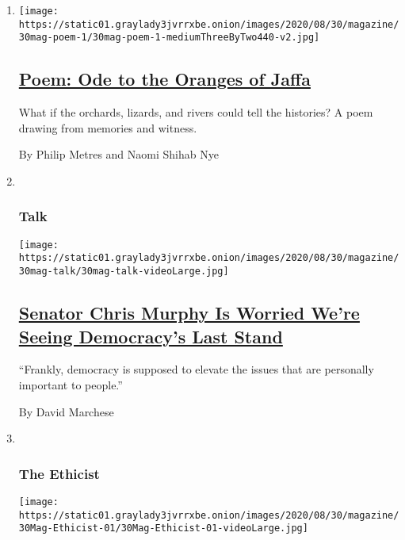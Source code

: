 \begin{enumerate}
\def\labelenumi{\arabic{enumi}.}
\item
  \texttt{[image: https://static01.graylady3jvrrxbe.onion/images/2020/08/30/magazine/30mag-poem-1/30mag-poem-1-mediumThreeByTwo440-v2.jpg]}

  \hypertarget{poem-ode-to-the-oranges-of-jaffa}{%
  \subsection{\texorpdfstring{\href{/2020/08/27/magazine/poem-ode-to-the-oranges-of-jaffa.html}{Poem:
  Ode to the Oranges of
  Jaffa}}{Poem: Ode to the Oranges of Jaffa}}\label{poem-ode-to-the-oranges-of-jaffa}}

  What if the orchards, lizards, and rivers could tell the histories? A
  poem drawing from memories and witness.

  By Philip Metres and Naomi Shihab Nye
\item ~
  \hypertarget{talk}{%
  \subsubsection{Talk}\label{talk}}

  \texttt{[image: https://static01.graylady3jvrrxbe.onion/images/2020/08/30/magazine/30mag-talk/30mag-talk-videoLarge.jpg]}

  \hypertarget{senator-chris-murphy-is-worried-were-seeing-democracys-last-stand}{%
  \subsection{\texorpdfstring{\href{/interactive/2020/08/24/magazine/chris-murphy-interview.html}{Senator
  Chris Murphy Is Worried We're Seeing Democracy's Last
  Stand}}{Senator Chris Murphy Is Worried We're Seeing Democracy's Last Stand}}\label{senator-chris-murphy-is-worried-were-seeing-democracys-last-stand}}

  ``Frankly, democracy is supposed to elevate the issues that are
  personally important to people.''

  By David Marchese
\item ~
  \hypertarget{the-ethicist}{%
  \subsubsection{The Ethicist}\label{the-ethicist}}

  \texttt{[image: https://static01.graylady3jvrrxbe.onion/images/2020/08/30/magazine/30Mag-Ethicist-01/30Mag-Ethicist-01-videoLarge.jpg]}


\end{enumerate}
